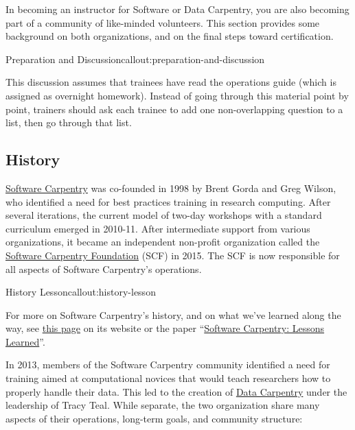 
In becoming an instructor for Software or Data Carpentry, you are also
becoming part of a community of like-minded volunteers. This section
provides some background on both organizations, and on the final steps
toward certification.

\begin{callout}{Preparation and Discussion}{callout:preparation-and-discussion}

This discussion assumes that trainees have read the operations
guide (which is assigned as overnight homework). Instead of going through this material point by
point, trainers should ask each trainee to add one non-overlapping
question to a list, then go through that list.
\end{callout}

\subsection{History}\label{history}

\href{http://software-carpentry.org}{Software Carpentry} was co-founded
in 1998 by Brent Gorda and Greg Wilson, who identified a need for best
practices training in research computing. After several iterations, the
current model of two-day workshops with a standard curriculum emerged in
2010-11. After intermediate support from various organizations, it
became an independent non-profit organization called the
\href{http://software-carpentry.org/scf/}{Software Carpentry Foundation}
(SCF) in 2015. The SCF is now responsible for all aspects of Software
Carpentry's operations.

\begin{callout}{History Lesson}{callout:history-lesson}

For more on Software Carpentry's history, and on what we've learned
along the way, see
\href{http://software-carpentry.org/scf/history/}{this page} on its
website or the paper
``\href{http://f1000research.com/articles/3-62/v2}{Software Carpentry: Lessons Learned}''.
\end{callout}

In 2013, members of the Software Carpentry community identified a need
for training aimed at computational novices that would teach researchers
how to properly handle their data. This led to the creation of
\href{http://datacarpentry.org}{Data Carpentry} under the leadership
of Tracy Teal. While separate, the two organization share many aspects
of their operations, long-term goals, and community structure:

